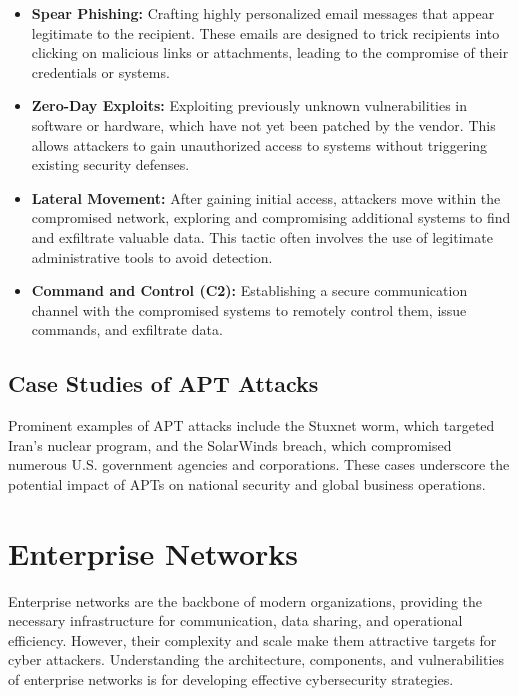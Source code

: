 \begin{itemize}
    \item \textbf{Spear Phishing:} Crafting highly personalized email messages that appear legitimate to the recipient. These emails are designed to trick recipients into clicking on malicious links or attachments, leading to the compromise of their credentials or systems.
    \item \textbf{Zero-Day Exploits:} Exploiting previously unknown vulnerabilities in software or hardware, which have not yet been patched by the vendor. This allows attackers to gain unauthorized access to systems without triggering existing security defenses.
    \item \textbf{Lateral Movement:} After gaining initial access, attackers move within the compromised network, exploring and compromising additional systems to find and exfiltrate valuable data. This tactic often involves the use of legitimate administrative tools to avoid detection.
    \item \textbf{Command and Control (C2):} Establishing a secure communication channel with the compromised systems to remotely control them, issue commands, and exfiltrate data.
\end{itemize}

\subsection{Case Studies of APT Attacks}

Prominent examples of APT attacks include the Stuxnet worm, which targeted Iran's nuclear program, and the SolarWinds breach, which compromised numerous U.S. government agencies and corporations. These cases underscore the potential impact of APTs on national security and global business operations.

\section{Enterprise Networks}

Enterprise networks are the backbone of modern organizations, providing the necessary infrastructure for communication, data sharing, and operational efficiency. However, their complexity and scale make them attractive targets for cyber attackers. Understanding the architecture, components, and vulnerabilities of enterprise networks is  for developing effective cybersecurity strategies.

